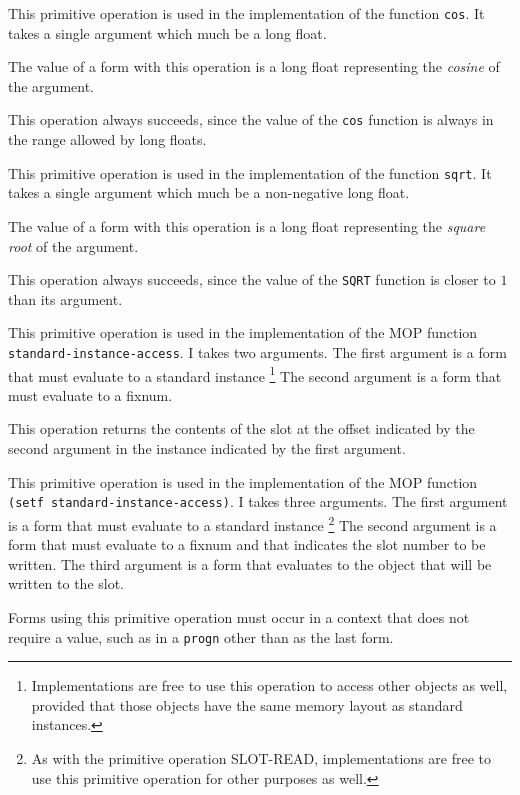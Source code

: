  {}

This primitive operation is used in the implementation of the
\commonlisp{} function \texttt{cos}.  It takes a single argument which
much be a long float.

The value of a form with this operation is a long float representing
the \emph{cosine} of the argument.

This operation always succeeds, since the value of the \texttt{cos}
function is always in the range allowed by long floats.

 {}

This primitive operation is used in the implementation of the
\commonlisp{} function \texttt{sqrt}.  It takes a single argument which
much be a non-negative long float.

The value of a form with this operation is a long float representing
the \emph{square root} of the argument.

This operation always succeeds, since the value of the \texttt{SQRT}
function is closer to $1$ than its argument.

 {}

This primitive operation is used in the implementation of the MOP
function \texttt{standard-instance-access}.  I takes two arguments.
The first argument is a form that must evaluate to a standard
instance%
\footnote{Implementations are free to use this operation to access
  other objects as well, provided that those objects have the same
  memory layout as standard instances.}
The second argument is a form that must evaluate to a fixnum.

This operation returns the contents of the slot at the offset
indicated by the second argument in the instance indicated by the
first argument.

 {}

This primitive operation is used in the implementation of the MOP
function \texttt{(setf standard-instance-access)}.  I takes three
arguments.  The first argument is a form that must evaluate to a
standard instance%
\footnote{As with the primitive operation SLOT-READ, implementations
  are free to use this primitive operation for other purposes as
  well.}
The second argument is a form that must evaluate to a fixnum and that
indicates the slot number to be written.  The third argument is a form
that evaluates to the object that will be written to the slot.

Forms using this primitive operation must occur in a context that does
not require a value, such as in a \texttt{progn} other than as the
last form.

